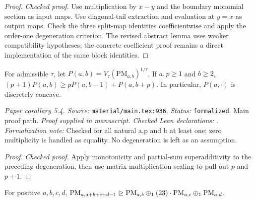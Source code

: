 \begin{proof}
\leanok
{}
\textit{Checked proof.} Use multiplication by $x-y$ and the boundary monomial section as input maps. Use diagonal-tail extraction and evaluation at $y=x$ as output maps. Check the three split-map identities coefficientwise and apply the order-one degeneration criterion. The revised abstract lemma uses weaker compatibility hypotheses; the concrete coefficient proof remains a direct implementation of the same block identities.
\end{proof}

\renewcommand{\thetheorem}{5.4}
\begin{corollary}
\label{cor:pm-concavity}
\manuscriptproof
{}
\leanok
For admissible $\tau$, let $P(a,b)=V_\tau(\mathrm{PM}_{a,b})^{1/\tau}$. If $a,p\ge1$ and $b\ge2$, $(p+1)P(a,b)\ge pP(a,b-1)+P(a,b+p)$. In particular, $P(a,\cdot)$ is discretely concave.
\end{corollary}

\noindent\textit{Paper corollary 5.4. Source:} \texttt{material/main.tex:936}.
\textit{Status:} \texttt{formalized}. Main proof path.
\textit{Proof supplied in manuscript.}
\textit{Checked Lean declarations:} .
\textit{Formalization note:} Checked for all natural a,p and b at least one; zero multiplicity is handled as equality. No degeneration is left as an assumption.

\begin{proof}
\leanok
{}
\textit{Checked proof.} Apply monotonicity and partial-sum superadditivity to the preceding degeneration, then use matrix multiplication scaling to pull out $p$ and $p+1$.
\end{proof}

\renewcommand{\thetheorem}{5.5}
\begin{lemma}
\label{lem:pm-tripling-degeneration}
\manuscriptproof
{}
\leanok
For positive $a,b,c,d$, $\mathrm{PM}_{a,a+b+c+d-1}\trianglerighteq\mathrm{PM}_{a,b}\mathbin{\oplus_1}(23)\cdot\mathrm{PM}_{a,c}\mathbin{\oplus_1}\mathrm{PM}_{a,d}$.
\end{lemma}

